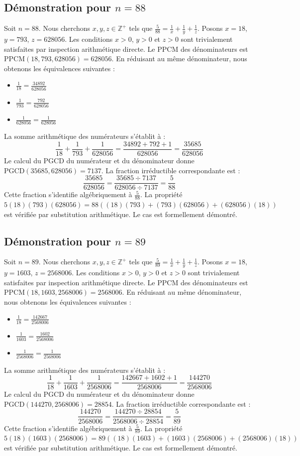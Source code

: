 \documentclass[12pt,a4paper]{article}
\begin{document}
\subsection{Démonstration pour $n = 88$}
Soit $n = 88$. Nous cherchons $x, y, z \in \mathbb{Z}^{+}$ tels que $\frac{5}{88} = \frac{1}{x} + \frac{1}{y} + \frac{1}{z}$.
Posons $x = 18$, $y = 793$, $z = 628056$.
Les conditions $x > 0$, $y > 0$ et $z > 0$ sont trivialement satisfaites par inspection arithmétique directe.
Le PPCM des dénominateurs est $\text{PPCM}(18, 793, 628056) = 628056$.
En réduisant au même dénominateur, nous obtenons les équivalences suivantes :
\begin{itemize}
    \item $\frac{1}{18} = \frac{34892}{628056}$
    \item $\frac{1}{793} = \frac{792}{628056}$
    \item $\frac{1}{628056} = \frac{1}{628056}$
\end{itemize}
La somme arithmétique des numérateurs s'établit à :
$$ \frac{1}{18} + \frac{1}{793} + \frac{1}{628056} = \frac{34892 + 792 + 1}{628056} = \frac{35685}{628056} $$
Le calcul du PGCD du numérateur et du dénominateur donne $\text{PGCD}(35685, 628056) = 7137$.
La fraction irréductible correspondante est :
$$ \frac{35685}{628056} = \frac{35685 \div 7137}{628056 \div 7137} = \frac{5}{88} $$
Cette fraction s'identifie algébriquement à $\frac{5}{88}$.
La propriété $5(18)(793)(628056) = 88((18)(793) + (793)(628056) + (628056)(18))$ est vérifiée par substitution arithmétique.
Le cas est formellement démontré.

\subsection{Démonstration pour $n = 89$}
Soit $n = 89$. Nous cherchons $x, y, z \in \mathbb{Z}^{+}$ tels que $\frac{5}{89} = \frac{1}{x} + \frac{1}{y} + \frac{1}{z}$.
Posons $x = 18$, $y = 1603$, $z = 2568006$.
Les conditions $x > 0$, $y > 0$ et $z > 0$ sont trivialement satisfaites par inspection arithmétique directe.
Le PPCM des dénominateurs est $\text{PPCM}(18, 1603, 2568006) = 2568006$.
En réduisant au même dénominateur, nous obtenons les équivalences suivantes :
\begin{itemize}
    \item $\frac{1}{18} = \frac{142667}{2568006}$
    \item $\frac{1}{1603} = \frac{1602}{2568006}$
    \item $\frac{1}{2568006} = \frac{1}{2568006}$
\end{itemize}
La somme arithmétique des numérateurs s'établit à :
$$ \frac{1}{18} + \frac{1}{1603} + \frac{1}{2568006} = \frac{142667 + 1602 + 1}{2568006} = \frac{144270}{2568006} $$
Le calcul du PGCD du numérateur et du dénominateur donne $\text{PGCD}(144270, 2568006) = 28854$.
La fraction irréductible correspondante est :
$$ \frac{144270}{2568006} = \frac{144270 \div 28854}{2568006 \div 28854} = \frac{5}{89} $$
Cette fraction s'identifie algébriquement à $\frac{5}{89}$.
La propriété $5(18)(1603)(2568006) = 89((18)(1603) + (1603)(2568006) + (2568006)(18))$ est vérifiée par substitution arithmétique.
Le cas est formellement démontré.
\end{document}
